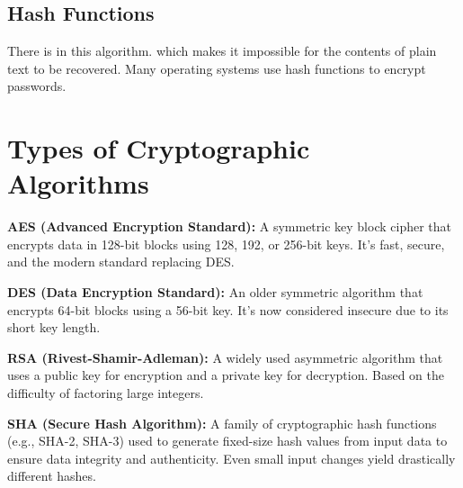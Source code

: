 {\subsection{Hash Functions}
There is  in this algorithm.  which makes it impossible for the contents of plain text to be recovered. Many operating systems use hash functions to encrypt passwords.}

\section{Types of Cryptographic Algorithms}

\textbf{AES (Advanced Encryption Standard):}
A symmetric key block cipher that encrypts data in 128-bit blocks using 128, 192, or 256-bit keys. It's fast, secure, and the modern standard replacing DES.

\textbf{DES (Data Encryption Standard):}
An older symmetric algorithm that encrypts 64-bit blocks using a 56-bit key. It's now considered insecure due to its short key length.

\textbf{RSA (Rivest-Shamir-Adleman):}
A widely used asymmetric algorithm that uses a public key for encryption and a private key for decryption. Based on the difficulty of factoring large integers.

\textbf{SHA (Secure Hash Algorithm):}
A family of cryptographic hash functions (e.g., SHA-2, SHA-3) used to generate fixed-size hash values from input data to ensure data integrity and authenticity. Even small input changes yield drastically different hashes.

